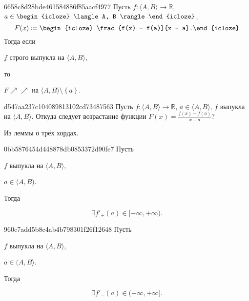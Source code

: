 \begin{note}{6658c8d28bde461584886f85aacf4977}
    Пусть \( f : \langle A, B \rangle \to \mathbb R \), \( a \in \begin{icloze}{3}\langle A, B \rangle\end{icloze} \),
    \[
        F(x) \coloneqq \begin{icloze}{4}\frac{f(x) - f(a)}{x - a}.\end{icloze}
    \]
    Тогда если \begin{icloze}{2}\( f \) строго выпукла на \( \langle A, B \rangle  \),\end{icloze} то
    \begin{icloze}{1}
        \begin{center}
            \( F \!\!\nearrow\!\nearrow  \) на \( \langle A, B \rangle \setminus \left\{ a \right\} \).
        \end{center}
    \end{icloze}
\end{note}

\begin{note}{d547aa237c104089813102cd73487563}
    Пусть  \({ f : \langle A, B \rangle \to \mathbb R }\), \({ a \in \langle A, B \rangle }\), \({ f }\) выпукла на \({ \langle A, B \rangle }\).
    Откуда следует возрастание функции \({ F(x) = \frac{f(x) - f(a)}{x - a} }\)?

    \begin{cloze}{1}
        Из леммы о трёх хордах.
    \end{cloze}
\end{note}

\begin{note}{0bb5876454d448878db0853372d90fe7}
    Пусть \begin{icloze}{3}\( f \) выпукла на \( \langle A, B \rangle  \),\end{icloze} \begin{icloze}{2}\( a \in \langle A, B )  \).\end{icloze} Тогда
    \begin{icloze}{1}
        \[
            \exists f'_+(a) \in [-\infty, +\infty ).
        \]
    \end{icloze}
\end{note}

\begin{note}{960c7add5b8c4ab4b798301f26f12648}
    Пусть \begin{icloze}{3}\( f \) выпукла на \( \langle A, B \rangle  \),\end{icloze} \begin{icloze}{2}\( a \in (A, B \rangle  \).\end{icloze} Тогда
    \begin{icloze}{1}
        \[
            \exists f'_-(a) \in (-\infty, +\infty ].
        \]
    \end{icloze}
\end{note}

